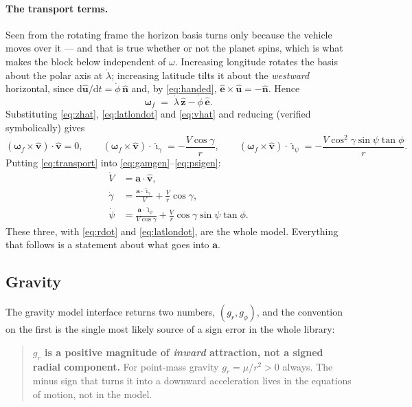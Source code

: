\documentclass[11pt]{article}
\newcommand{\vhat}{\hat{\mathbf{v}}}
\newcommand{\ig}{\hat{\boldsymbol{\imath}}_{\gamma}}
\newcommand{\ip}{\hat{\boldsymbol{\imath}}_{\psi}}
\newcommand{\nhat}{\hat{\mathbf{n}}}
\newcommand{\ehat}{\hat{\mathbf{e}}}
\newcommand{\uhat}{\hat{\mathbf{u}}}
\newcommand{\zhat}{\hat{\mathbf{z}}}
\newcommand{\bomega}{\boldsymbol{\omega}}
\newcommand{\dd}{\mathrm{d}}
\begin{document}
\paragraph{The transport terms.}
Seen from the rotating frame the horizon basis turns only because the vehicle
moves over it --- and that is true whether or not the planet spins, which is
what makes the block below independent of $\omega$. Increasing longitude rotates the basis about the polar axis at
$\dot\lambda$; increasing latitude tilts it about the \emph{westward}
horizontal, since $\dd\uhat/\dd t = \dot\phi\,\nhat$ and, by
\eqref{eq:handed}, $\ehat\times\uhat = -\nhat$. Hence
\begin{equation}
  \bomega_f \;=\; \dot\lambda\,\zhat - \dot\phi\,\ehat .
  \label{eq:omegaf}
\end{equation}
Substituting \eqref{eq:zhat}, \eqref{eq:latlondot} and \eqref{eq:vhat} and
reducing (verified symbolically) gives
\begin{equation}
  (\bomega_f\times\vhat)\cdot\vhat = 0,
  \qquad
  (\bomega_f\times\vhat)\cdot\ig = -\frac{V\cos\gamma}{r},
  \qquad
  (\bomega_f\times\vhat)\cdot\ip = -\frac{V\cos^2\!\gamma\sin\psi\tan\phi}{r} .
  \label{eq:transport}
\end{equation}
Putting \eqref{eq:transport} into \eqref{eq:gamgen}--\eqref{eq:psigen}:
\begin{align}
  \dot V     &= \mathbf{a}\cdot\vhat ,                                             \label{eq:Vgen2}\\
  \dot\gamma &= \frac{\mathbf{a}\cdot\ig}{V} + \frac{V}{r}\cos\gamma ,              \label{eq:gamgen2}\\
  \dot\psi   &= \frac{\mathbf{a}\cdot\ip}{V\cos\gamma}
                + \frac{V}{r}\cos\gamma\sin\psi\tan\phi .                           \label{eq:psigen2}
\end{align}
These three, with \eqref{eq:rdot} and \eqref{eq:latlondot}, are the whole
model. Everything that follows is a statement about what goes into
$\mathbf{a}$.

\subsection{Gravity}
\label{sec:gravity}

The gravity model interface returns two numbers, $(g_r,g_\phi)$, and the
convention on the first is the single most likely source of a sign error in the
whole library:

\begin{quote}
\textbf{$g_r$ is a positive magnitude of \emph{inward} attraction, not a signed
radial component.} For point-mass gravity $g_r = \mu/r^2 > 0$ always. The minus
sign that turns it into a downward acceleration lives in the equations of
motion, not in the model.
\end{quote}
\end{document}
